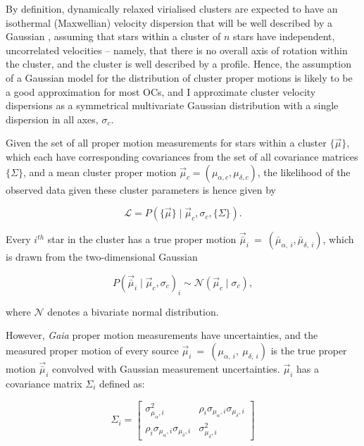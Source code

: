 By definition, dynamically relaxed virialised clusters are expected to have an isothermal (Maxwellian) velocity dispersion that will be well described by a Gaussian \citep{king_structure_1966,portegies_zwart_young_2010}, assuming that stars within a cluster of $n$ stars have independent, uncorrelated velocities -- namely, that there is no overall axis of rotation within the cluster, and the cluster is well described by a \cite{king_structure_1966} profile. Hence, the assumption of a Gaussian model for the distribution of cluster proper motions is likely to be a good approximation for most OCs, and I approximate cluster velocity dispersions as a symmetrical multivariate Gaussian distribution with a single dispersion in all axes, $\sigma_c$.

Given the set of all proper motion measurements for stars within a cluster $\{\vec{\mu}\}$, which each have corresponding covariances from the set of all covariance matrices  $\{\Sigma\}$, and a mean cluster proper motion $\vec{\mu}_c = (\mu_{\alpha, c}, \mu_{\delta, c})$, the likelihood of the observed data given these cluster parameters is hence given by

\begin{equation}\label{eqn:dynamics:velocities:likelihood}
    \mathcal{L} 
    = P(\{\vec{\mu}\}\mid\vec{\mu}_c,\sigma_c,\{\Sigma\}).
\end{equation}

Every $i^{th}$ star in the cluster has a true proper motion $\vec{\bar{\mu}}_i~=~(\bar{\mu}_{\alpha,~i},\bar{\mu}_{\delta,~i})$, which is drawn from the two-dimensional Gaussian

\begin{equation}\label{eqn:dynamics:velocities:generative_model}
    P(\vec{\bar{\mu}}_i \mid
    \vec{\mu}_c, \sigma_c)_i \sim \mathcal{N}(\vec{\mu}_c \mid \sigma_c),
\end{equation}

\noindent
where $\mathcal{N}$ denotes a bivariate normal distribution.

However, \emph{Gaia} proper motion measurements have uncertainties, and the measured proper motion of every source $\vec{\mu}_i~=~(\mu_{\alpha,~i},~\mu_{\delta,~i})$ is the true proper motion $\vec{\bar{\mu}}_i$ convolved with Gaussian measurement uncertainties. $\vec{\mu}_i$ has a covariance matrix $\Sigma_i$ defined as:

\begin{equation}
    \Sigma_i = 
        \begin{bmatrix}
        \sigma_{\mu_\alpha, i}^2 
        & \rho_i \sigma_{\mu_\alpha, i} \sigma_{\mu_\delta, i}\\
        \rho_i \sigma_{\mu_\alpha, i} \sigma_{\mu_\delta, i}
        & \sigma_{\mu_\delta, i}^2
        \end{bmatrix}
\end{equation}


